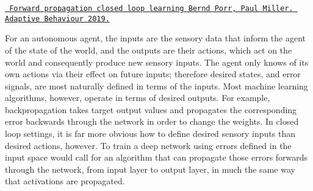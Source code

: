 \href{https://journals.sagepub.com/doi/10.1177/1059712319851070}{\texttt{ Forward propagation closed loop learning Bernd Porr, Paul Miller. Adaptive Behaviour 2019.}}

For an autonomous agent, the inputs are the sensory data that inform the agent of the state of the world, and the outputs are their actions, which act on the world and consequently produce new sensory inputs. The agent only knows of its own actions via their effect on future inputs; therefore desired states, and error signals, are most naturally defined in terms of the inputs. Most machine learning algorithms, however, operate in terms of desired outputs. For example, backpropagation takes target output values and propagates the corresponding error backwards through the network in order to change the weights. In closed loop settings, it is far more obvious how to define desired sensory inputs than desired actions, however. To train a deep network using errors defined in the input space would call for an algorithm that can propagate those errors forwards through the network, from input layer to output layer, in much the same way that activations are propagated. 